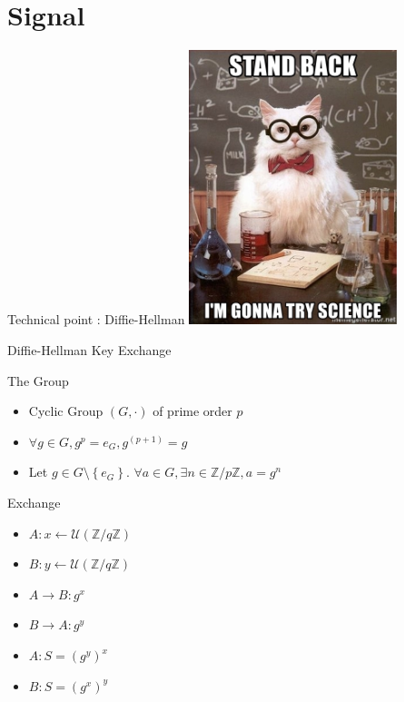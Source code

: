 \documentclass{beamer}
\newcommand{\ZZ}{\mathbb{Z}}
\newcommand{\Uu}{\mathcal{U}}
\newcommand{\la}{\leftarrow}
\newcommand{\ra}{\rightarrow}
\newcommand{\set}[1]{\left\{ #1 \right\}}
\begin{document}
\section{Signal}
\begin{frame}{Technical point : Diffie-Hellman}
	\center
	\includegraphics[height=8cm]{img/stand-back-im-gonna-try-science.jpg} 
\end{frame}

\begin{frame}{Diffie-Hellman Key Exchange}
	\begin{block}{The Group}
		\begin{itemize}
			\item Cyclic Group $(G, \cdot)$ of prime order $p$
			\item $\forall g \in G, g^p = e_G, g^{(p+1)} = g$
			\item Let $g \in G\setminus \set{e_G}$. $\forall a \in G, \exists n \in \ZZ / p\ZZ, a = g^n$
		\end{itemize}
	\end{block}

	\pause

	\begin{block}{Exchange}
		\begin{itemize}
			\item $A : x \la \Uu(\ZZ / q\ZZ)$
			\item $B : y \la \Uu(\ZZ / q\ZZ)$
			\item $A \ra B : g^x$
			\item $B \ra A : g^y$
			\item $A : S = (g^y)^x$
			\item $B : S = (g^x)^y$
		\end{itemize}
	\end{block}

\end{frame}
\end{document}
